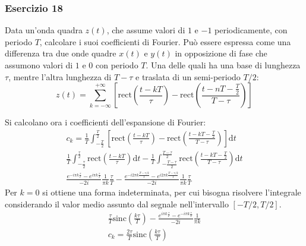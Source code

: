 \documentclass{article}
\newcommand{\rect}{\mathrm{rect}}
\newcommand{\sinc}{\mathrm{sinc}}
\newcommand{\df}{\mathrm{d}}
\begin{document}
\subsubsection*{Esercizio 18}

Data un'onda quadra $z(t)$, che assume valori di $1$ e $-1$ periodicamente, con periodo $T$, calcolare i suoi coefficienti di Fourier. 
Può essere espressa come una differenza tra due onde quadre $x(t)$ e $y(t)$ in 
opposizione di fase che assumono valori di $1$ e $0$ con periodo $T$. Una delle quali ha una base di lunghezza $\tau$, mentre l'altra lunghezza di $T-\tau$ e traslata di un 
semi-periodo $T/2$:
\begin{equation*}
    z(t)=\displaystyle\sum_{k=-\infty}^{+\infty}\left[\rect\left(\frac{t-kT}{\tau}\right)-\rect\left(\frac{t-nT-\frac{T}{2}}{T-\tau}\right)\right]
\end{equation*}
\begin{center}
\end{center}
Si calcolano ora i coefficienti dell'espansione di Fourier:
\begin{gather*}
    c_k=\displaystyle\frac{1}{T}\int_{-\frac{T}{2}}^{\frac{T}{2}}\left[\rect\left(\frac{t-kT}{\tau}\right)-\rect\left(\frac{t-kT-\frac{T}{2}}{T-\tau}\right)\right]\df t\\
    \displaystyle\frac{1}{T}\int_{-\frac{\tau}{2}}^{\frac{\tau}{2}}\rect\left(\frac{t-kT}{\tau}\right)\df t-\frac{1}{T}\int_{-\frac{T-\tau}{2}}^{\frac{T-\tau}{2}}\rect\left(\frac{t-kT-\frac{T}{2}}{T-\tau}\right)\df t\\
    \displaystyle\frac{e^{-i\pi k\frac{\tau}{T}}-e^{i\pi k\frac{\tau}{T}}}{-2i}\frac{1}{\pi k}\frac{\tau}{T}-\frac{e^{-i2\pi k\frac{T-\tau/2}{T}}-e^{i2\pi k\frac{T-\tau/2}{T}}}{-2i}\frac{1}{\pi k}\frac{\tau}{T}
\end{gather*}
Per $k=0$ si ottiene una forma indeterminata, per cui bisogna risolvere l'integrale considerando il valor medio assunto dal segnale nell'intervallo $\left[-T/2,T/2\right]$. 
\begin{gather*}
    \displaystyle\frac{\tau}{T}\sinc\left(\frac{k\tau}{T}\right)-\frac{e^{i\pi k\frac{\tau}{T}}-e^{-i\pi k\frac{\tau}{T}}}{-2i}\frac{1}{\pi k}\\
    c_k=\displaystyle\frac{2\tau}{T}\sinc\left(\frac{k\tau}{T}\right)
\end{gather*}
\end{document}
